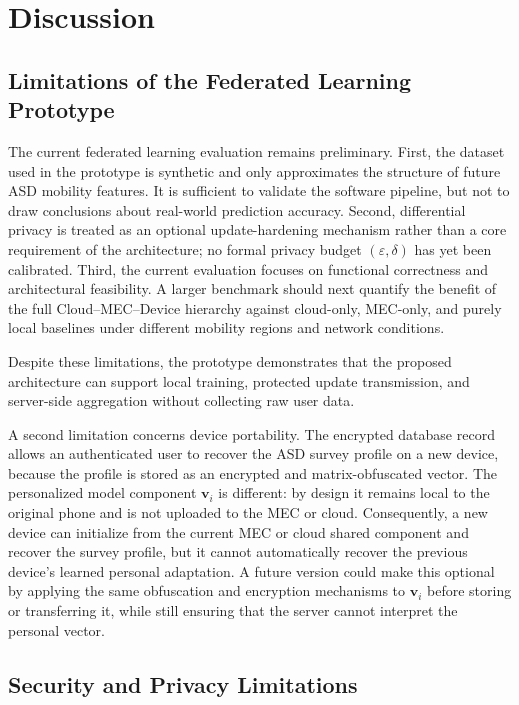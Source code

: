 \documentclass[lettersize,journal]{IEEEtran}
\begin{document}
\section{Discussion}
\subsection{Limitations of the Federated Learning Prototype}

The current federated learning evaluation remains preliminary. First,
the dataset used in the prototype is synthetic and only approximates the
structure of future ASD mobility features. It is sufficient to validate
the software pipeline, but not to draw conclusions about real-world
prediction accuracy. Second, differential privacy is treated as an
optional update-hardening mechanism rather than a core requirement of
the architecture; no formal privacy budget $(\varepsilon, \delta)$ has
yet been calibrated. Third, the current evaluation focuses on
functional correctness and architectural feasibility. A larger benchmark
should next quantify the benefit of the full Cloud--MEC--Device
hierarchy against cloud-only, MEC-only, and purely local baselines under
different mobility regions and network conditions.

Despite these limitations, the prototype demonstrates that the proposed
architecture can support local training, protected update transmission,
and server-side aggregation without collecting raw user data.

A second limitation concerns device portability. The encrypted database
record allows an authenticated user to recover the ASD survey profile on
a new device, because the profile is stored as an encrypted and
matrix-obfuscated vector. The personalized model component
$\mathbf{v}_i$ is different: by design it remains local to the original
phone and is not uploaded to the MEC or cloud. Consequently, a new
device can initialize from the current MEC or cloud shared component and
recover the survey profile, but it cannot automatically recover the
previous device's learned personal adaptation. A future version could
make this optional by applying the same obfuscation and encryption
mechanisms to $\mathbf{v}_i$ before storing or transferring it, while
still ensuring that the server cannot interpret the personal vector.

\subsection{Security and Privacy Limitations}
\end{document}

